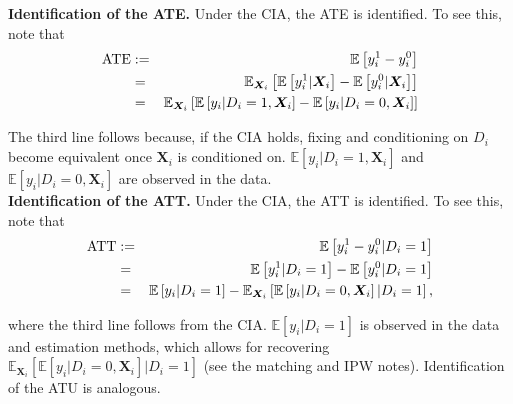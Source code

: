 \noindent \textbf{Identification of the ATE.} Under the CIA, the ATE is identified. To see this, note that 
\begin{eqnarray}
\text{ATE} &:=& \mathbb{E} \left[ y_i^1 -y_i^0 \right] \nonumber \\
		&=&  \mathbb{E}_{ \bm{X}_{i}} \left[ \mathbb{E} \left[ y_i^1 |  \bm{X}_{i} \right] -  \mathbb{E} \left[ y_i^0 |  \bm{X}_{i} \right] \right] \noindent \\ 
		&=& \mathbb{E}_{ \bm{X}_{i}} \left[ \mathbb{E} \left[ y_i | D_i = 1,  \bm{X}_{i} \right] -  \mathbb{E} \left[ y_i | D_i = 0,  \bm{X}_{i} \right] \right]
\end{eqnarray}

\noindent The third line follows because, if the CIA holds, fixing and conditioning on $D_{i}$ become equivalent once $ \bm{X}_{i}$ is conditioned on. $\mathbb{E} \left[ y_i | D_i = 1,  \bm{X}_{i} \right]$ and $\mathbb{E} \left[ y_i | D_i = 0,  \bm{X}_{i} \right]$ are observed in the data.\\

\noindent \textbf{Identification of the ATT.} Under the CIA, the ATT is identified. To see this, note that 
 \begin{eqnarray}
\text{ATT} &:=& \mathbb{E} \left[ y_i^1 - y_i^0 | D_i = 1 \right] \nonumber \\
		&=&  \mathbb{E} \left[ y_i^1 | D_i = 1 \right] -  \mathbb{E} \left[ y_i^0 | D_i = 1 \right] \noindent \\
		&=& \mathbb{E} \left[ y_i | D_i = 1 \right] -  \mathbb{E}_{ \bm{X}_{i}} \left[ \mathbb{E} \left[ y_i | D_i = 0,  \bm{X}_{i} \right] | D_i = 1 \right],
\end{eqnarray}

\noindent where the third line follows from the CIA. $\mathbb{E} \left[ y_i | D_i = 1 \right]$ is observed in the data and estimation methods, which allows for recovering $\mathbb{E}_{ \bm{X}_{i}} \left[ \mathbb{E} \left[ y_i | D_i = 0,  \bm{X}_{i} \right] | D_i = 1 \right]$ (see the matching and IPW notes). Identification of the ATU is analogous.\\

